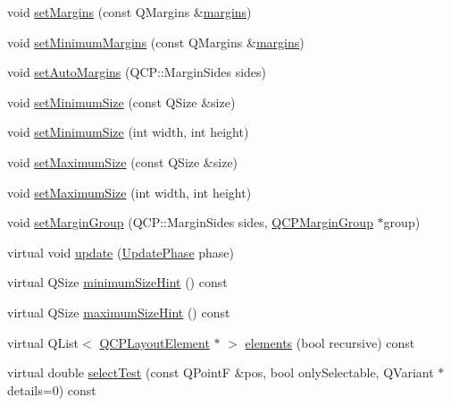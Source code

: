 \begin{DoxyCompactItemize}
void \hyperlink{classQCPLayoutElement_a8f450b1f3f992ad576fce2c63d8b79cf}{set\+Margins} (const Q\+Margins \&\hyperlink{classQCPLayoutElement_a85ff977dfcced84eef32d9f819ec9543}{margins})
\item 
void \hyperlink{classQCPLayoutElement_a0a8a17abc16b7923159fcc7608f94673}{set\+Minimum\+Margins} (const Q\+Margins \&\hyperlink{classQCPLayoutElement_a85ff977dfcced84eef32d9f819ec9543}{margins})
\item 
void \hyperlink{classQCPLayoutElement_accfda49994e3e6d51ed14504abf9d27d}{set\+Auto\+Margins} (Q\+C\+P\+::\+Margin\+Sides sides)
\item 
void \hyperlink{classQCPLayoutElement_a5dd29a3c8bc88440c97c06b67be7886b}{set\+Minimum\+Size} (const Q\+Size \&size)
\item 
void \hyperlink{classQCPLayoutElement_a8e0447614a0bf92de9a7304588c6b96e}{set\+Minimum\+Size} (int width, int height)
\item 
void \hyperlink{classQCPLayoutElement_a74eb5280a737ab44833d506db65efd95}{set\+Maximum\+Size} (const Q\+Size \&size)
\item 
void \hyperlink{classQCPLayoutElement_a03e0e9c48f230217c529b0819f832d84}{set\+Maximum\+Size} (int width, int height)
\item 
void \hyperlink{classQCPLayoutElement_a516e56f76b6bc100e8e71d329866847d}{set\+Margin\+Group} (Q\+C\+P\+::\+Margin\+Sides sides, \hyperlink{classQCPMarginGroup}{Q\+C\+P\+Margin\+Group} $\ast$group)
\item 
virtual void \hyperlink{classQCPLayoutElement_a929c2ec62e0e0e1d8418eaa802e2af9b}{update} (\hyperlink{classQCPLayoutElement_a0d83360e05735735aaf6d7983c56374d}{Update\+Phase} phase)
\item 
virtual Q\+Size \hyperlink{classQCPLayoutElement_aebe14fb71f858c0f98caf8d342a9864a}{minimum\+Size\+Hint} () const 
\item 
virtual Q\+Size \hyperlink{classQCPLayoutElement_adbd3a00fec44c977150c6be7329eb801}{maximum\+Size\+Hint} () const 
\item 
virtual Q\+List$<$ \hyperlink{classQCPLayoutElement}{Q\+C\+P\+Layout\+Element} $\ast$ $>$ \hyperlink{classQCPLayoutElement_a311d60d78e62ef8eaaedb1b6ceb9e788}{elements} (bool recursive) const 
\item 
virtual double \hyperlink{classQCPLayoutElement_a9fcf5d0ea19f2c23b2b528bce2c6f095}{select\+Test} (const Q\+PointF \&pos, bool only\+Selectable, Q\+Variant $\ast$details=0) const 
\end{DoxyCompactItemize}

